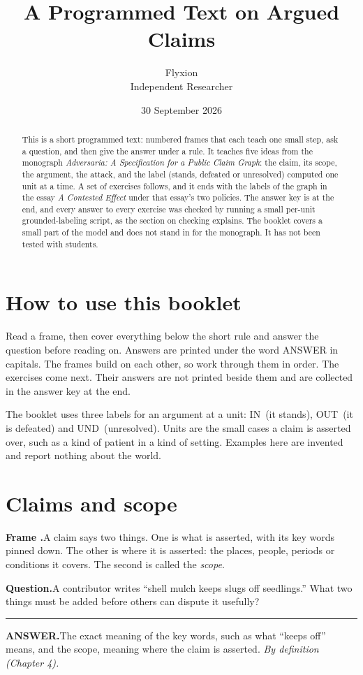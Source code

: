 \documentclass[11pt]{article}
\title{A Programmed Text on Argued Claims}
\author{Flyxion\\\small Independent Researcher}
\date{30 September 2026}
\newcommand{\IN}{\textsf{IN}}
\newcommand{\OUT}{\textsf{OUT}}
\newcommand{\UND}{\textsf{UND}}
\newcounter{fr}
\newcounter{ex}
\newcommand{\Frame}[3]{\par\vspace{3pt}\noindent\begin{minipage}{\textwidth}\refstepcounter{fr}\noindent\textbf{Frame \thefr.}\enspace #1\par\vspace{-0.2em}\noindent\textbf{Question.}\enspace #2\par\vspace{-0.3em}\noindent\rule{0.4\textwidth}{0.4pt}\par\vspace{-0.6em}\noindent\textbf{ANSWER.}\enspace #3\par\end{minipage}\par}
\begin{document}
\maketitle

\begin{abstract}
\noindent
This is a short programmed text: numbered frames that each teach one small step, ask a question, and then give the answer under a rule. It teaches five ideas from the monograph \emph{Adversaria: A Specification for a Public Claim Graph}: the claim, its scope, the argument, the attack, and the label (stands, defeated or unresolved) computed one unit at a time. A set of exercises follows, and it ends with the labels of the graph in the essay \emph{A Contested Effect} under that essay's two policies. The answer key is at the end, and every answer to every exercise was checked by running a small per-unit grounded-labeling script, as the section on checking explains. The booklet covers a small part of the model and does not stand in for the monograph. It has not been tested with students.
\end{abstract}

\section{How to use this booklet}

Read a frame, then cover everything below the short rule and answer the question before reading on. Answers are printed under the word ANSWER in capitals. The frames build on each other, so work through them in order. The exercises come next. Their answers are not printed beside them and are collected in the answer key at the end.

The booklet uses three labels for an argument at a unit: \IN\ (it stands), \OUT\ (it is defeated) and \UND\ (unresolved). Units are the small cases a claim is asserted over, such as a kind of patient in a kind of setting. Examples here are invented and report nothing about the world.

\section{Claims and scope}

\Frame{A claim says two things. One is what is asserted, with its key words pinned down. The other is where it is asserted: the places, people, periods or conditions it covers. The second is called the \emph{scope}.}{A contributor writes ``shell mulch keeps slugs off seedlings.'' What two things must be added before others can dispute it usefully?}{The exact meaning of the key words, such as what ``keeps off'' means, and the scope, meaning where the claim is asserted. \emph{By definition (Chapter 4).}}
\end{document}
